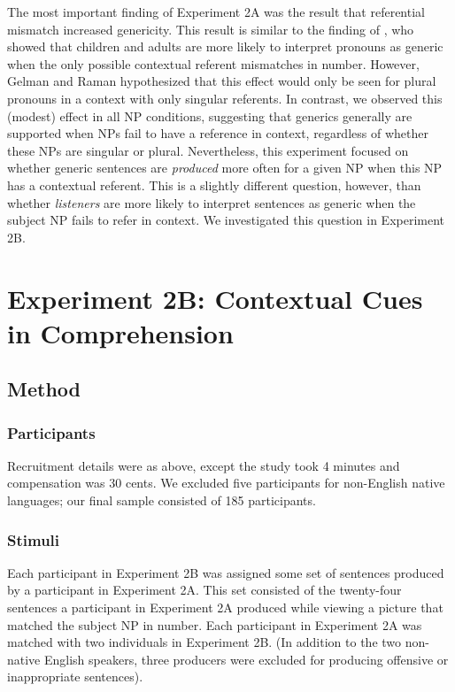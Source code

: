 \documentclass[10pt,letterpaper]{article}
\begin{document}
The most important finding of Experiment 2A was the result that referential mismatch increased genericity. 
This result is similar to the finding of , who showed that children and adults are more likely to interpret pronouns as generic when the only possible contextual referent mismatches in number. However, Gelman and Raman hypothesized that this effect would only be seen for plural pronouns in a context with only singular referents. In contrast, we observed this (modest) effect in all NP conditions, suggesting that generics generally are supported when NPs fail to have a reference in context, regardless of whether these NPs are singular or plural. Nevertheless, this experiment focused on whether generic sentences are \emph{produced} more often for a given NP when this NP has a contextual referent. This is a slightly different question, however, than whether \emph{listeners} are more likely to interpret sentences as generic when the subject NP fails to refer in context. We investigated this question in Experiment 2B. 

\section{Experiment 2B: Contextual Cues in Comprehension}

\subsection{Method}

\subsubsection{Participants} Recruitment details were as above, except the study took 4 minutes and compensation was 30 cents. We excluded five participants for non-English native languages; our final sample consisted of 185 participants.

\subsubsection{Stimuli} 

Each participant in Experiment 2B was assigned some set of sentences produced by a participant in Experiment 2A. This set consisted of the twenty-four sentences a participant in Experiment 2A produced while viewing a picture that matched the subject NP in number. Each participant in Experiment 2A was matched with two individuals in Experiment 2B. (In addition to the two non-native English speakers, three producers were excluded for producing offensive or inappropriate sentences).
\end{document}

